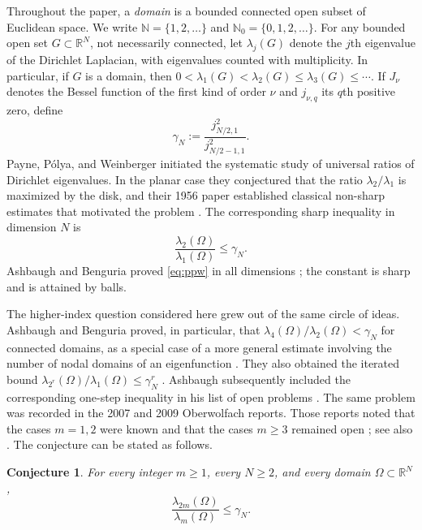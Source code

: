 \documentclass[11pt,letterpaper,reqno]{amsart}
\newtheorem{conjecture}[conjecture]{Conjecture}
\theoremstyle{definition}
\newcommand{\R}{\mathbb{R}}
\begin{document}
Throughout the paper, a \emph{domain} is a bounded connected open subset of
Euclidean space. We write $\mathbb N=\{1,2,\ldots\}$ and
$\mathbb N_0=\{0,1,2,\ldots\}$. For any bounded open set
$G\subset\R^N$, not necessarily connected, let $\lambda_j(G)$ denote the
$j$th eigenvalue of the Dirichlet Laplacian, with eigenvalues counted with
multiplicity. In particular, if $G$ is a domain, then
$0<\lambda_1(G)<\lambda_2(G)\leq\lambda_3(G)\leq\cdots$.
If $J_\nu$ denotes the Bessel function of the first kind of order $\nu$
and $j_{\nu,q}$ its $q$th positive zero, define
\[
 \gamma_N:=\frac{j_{N/2,1}^2}{j_{N/2-1,1}^2}.
\]
Payne, P\'olya, and Weinberger initiated the systematic study of universal
ratios of Dirichlet eigenvalues.  In the planar case they conjectured that
the ratio $\lambda_2/\lambda_1$ is maximized by the disk, and their 1956
paper established classical non-sharp estimates that motivated the problem
\cite{PPW1956}.  The corresponding sharp inequality in dimension $N$ is
\begin{equation}\label{eq:ppw}
 \frac{\lambda_2(\Omega)}{\lambda_1(\Omega)}\leq\gamma_N.
\end{equation}
Ashbaugh and Benguria proved \eqref{eq:ppw} in all dimensions
\cite{AshbaughBenguria1992}; the constant is sharp and is attained by balls.



The higher-index question considered here grew out of the same circle of
ideas.  Ashbaugh and Benguria proved, in particular, that
$\lambda_4(\Omega)/\lambda_2(\Omega)<\gamma_N$ for connected domains, as a
special case of a more general estimate involving the number of nodal domains
of an eigenfunction \cite{AshbaughBenguria1993}.  They also obtained the
iterated bound
$\lambda_{2^r}(\Omega)/\lambda_1(\Omega)\leq\gamma_N^r$
\cite{AshbaughBenguria1994}.  Ashbaugh subsequently included the corresponding
one-step inequality in his list of open problems
\cite[Problem~3, p.~15]{Ashbaugh1999}.  The same problem was recorded in the
2007 and 2009 Oberwolfach reports.  Those reports noted that the cases
$m=1,2$ were known and that the cases $m\geq3$ remained open
\cite[p.~1021]{BucurButtazzoHenrot2007}; see also
\cite[pp.~400--401]{AshbaughBenguriaLaugesenWeidl2009}.
The conjecture can be stated as follows.

\begin{conjecture}\label{conj:ashbaugh}
For every integer $m\geq1$, every $N\geq2$, and every domain
$\Omega\subset\R^N$,
\begin{equation}\label{eq:ashbaugh}
 \frac{\lambda_{2m}(\Omega)}{\lambda_m(\Omega)}\leq\gamma_N.
\end{equation}
\end{conjecture}
\end{document}
